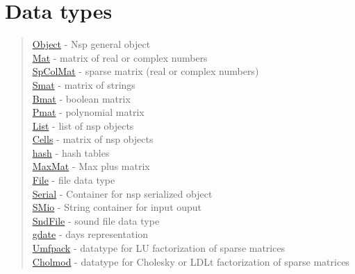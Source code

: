 \chapter*{Data types}


\begin{quote}
\noindent
\hyperlink{Object}{Object} - Nsp general object  \\
\hyperlink{Mat}{Mat} - matrix of real or complex numbers \\
\hyperlink{SpColMat}{SpColMat} - sparse matrix (real or complex numbers) \\
\hyperlink{Smat}{Smat} - matrix of strings  \\
\hyperlink{Bmat}{Bmat} - boolean matrix  \\
\hyperlink{Pmat}{Pmat} - polynomial matrix  \\
\hyperlink{list}{List} - list  of nsp objects  \\
\hyperlink{Cells}{Cells} - matrix of nsp objects  \\
\hyperlink{hash}{hash} - hash tables  \\
\hyperlink{MaxMat}{MaxMat} - Max plus matrix  \\
\hyperlink{File}{File} - file data type  \\
\hyperlink{Serial}{Serial} - Container for nsp serialized object \\
\hyperlink{SMio}{SMio} - String container for input ouput \\
\hyperlink{SndFile}{SndFile} - sound file data type \\
\hyperlink{gdate}{gdate} - days representation \\
\hyperlink{Umfpack}{Umfpack} - datatype for LU factorization of sparse matrices \\
\hyperlink{Cholmod}{Cholmod} - datatype for Cholesky or LDLt factorization of sparse matrices \\
\end{quote}


 
 
 
 
 
 
 
 
 
 
 
 
 
 
 
 
 

